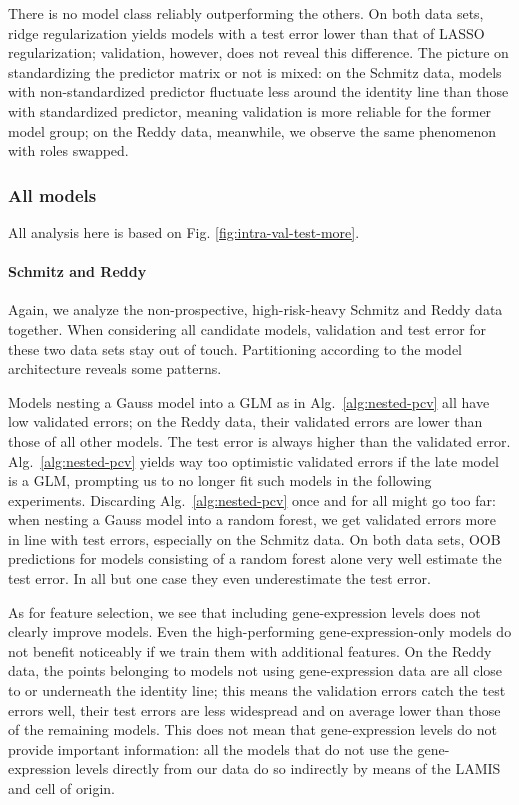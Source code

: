 There is no model class reliably outperforming the others. On both data sets, ridge 
regularization yields models with a test error lower than that of LASSO regularization; validation, 
however, does not reveal this difference. The picture on standardizing the predictor matrix or not 
is mixed: on the 
Schmitz data, models with non-standardized predictor fluctuate less around the identity line than 
those with standardized predictor, meaning validation is more reliable for the former model group;
on the Reddy data, meanwhile, we observe the same phenomenon with roles swapped.

\subsubsection{All models}



All analysis here is based on Fig. \ref{fig:intra-val-test-more}.

\paragraph{Schmitz and Reddy}
Again, we analyze the non-prospective, high-risk-heavy Schmitz and Reddy data together. When 
considering all candidate models, validation and test error for these two data sets 
stay out of touch. Partitioning according to the model architecture reveals some patterns. 

Models 
nesting a Gauss model into a GLM as in Alg.\ \ref{alg:nested-pcv} all have low validated errors; on 
the Reddy data, their validated errors are lower than those of all other models. The test error is 
always higher than the validated error. Alg.\ \ref{alg:nested-pcv} 
yields way too optimistic validated errors if the late model is a GLM, prompting us to no longer 
fit such models in the following experiments. Discarding Alg.\ \ref{alg:nested-pcv} once and for all
might go too far: when nesting a Gauss model into a random forest, we get validated errors more in 
line with test errors, especially on the Schmitz data. On both data sets, OOB predictions for 
models consisting of a random forest alone very well estimate the test error. In all but one case 
they even underestimate the test error. 

As for feature selection, we see that including gene-expression levels does not clearly improve
models. Even the high-performing gene-expression-only models do not benefit noticeably if
we train them with additional features. On the Reddy data, the points belonging to models not using 
gene-expression data are all close to or underneath the identity line; this means the validation 
errors 
catch the test errors well, their test errors are less widespread and on average lower than those 
of the remaining models. This does not mean that gene-expression levels do not provide important 
information: all the models that do not use the gene-expression levels directly from our data 
do so indirectly by means of the LAMIS and cell of origin. 

